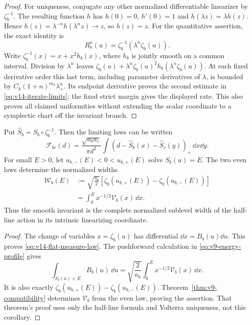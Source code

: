 \begin{proof}
For uniqueness, conjugate any other normalized differentiable
linearizer by $\zeta_b^{-1}$. The resulting function $h$ has
$h(0)=0$, $h'(0)=1$ and $h(\lambda z)=\lambda h(z)$. Hence
$h(z)=\lambda^{-n}h(\lambda^nz)\to z$, so $h(z)=z$.
For the quantitative assertion, the exact identity is
\[
 R_b^n(u)=\zeta_b^{-1}(\lambda^n\zeta_b(u)).
\]
Write $\zeta_b^{-1}(x)=x+x^2h_b(x)$, where $h_b$ is jointly
smooth on a common interval. Division by $\lambda^n$ leaves
$\zeta_b(u)+\lambda^n\zeta_b(u)^2h_b(\lambda^n\zeta_b(u))$.
At each fixed derivative order this last term, including parameter
derivatives of $\lambda$, is bounded by
$C_k(1+n)^{m_k}\lambda_+^n$. Its endpoint derivative proves the
second estimate in \eqref{eq:v14-iterate-limits}; the fixed strict
margin gives the displayed rate. This also proves all claimed
uniformities without extending the scalar coordinate to a symplectic
chart off the invariant branch.
\end{proof}


\begin{corollary}
\label{cor:v14-width}
Put $\widehat S_b=S_b\circ\zeta_b^{-1}$. Then the limiting laws
can be written
\begin{equation}\label{eq:v14-flat-measure-law}
 \mathcal F_{bc}(d)=\frac{\sqrt{a_ba_c}}{\pi d^2}
       \int(d-\widehat S_b(x)-\widehat S_c(y))_+\,\dd x\dd y.
\end{equation}
For small $E>0$, let $u_{b,-}(E)<0<u_{b,+}(E)$ solve $S_b(u)=E$.
The two even laws determine the normalized widths
\begin{equation}\label{eq:v14-width}
 \begin{split}
 \mathcal W_b(E)
   &:=\sqrt{\frac{a_b}{2}}
       [\zeta_b(u_{b,+}(E))-\zeta_b(u_{b,-}(E))]\\
   &=\int_0^E x^{-1/2}\mathcal V_b(x)\,\dd x.
 \end{split}
\end{equation}
Thus the smooth invariant is the complete normalized sublevel width
of the half-line action in its intrinsic linearizing coordinate.
\end{corollary}
\begin{proof}
The change of variables $x=\zeta_b(u)$ has differential
$\dd x=B_b(u)\dd u$. This proves \eqref{eq:v14-flat-measure-law}.
The pushforward calculation in \eqref{eq:v9-energy-profile} gives
\[
 \int_{S_b(u)<E}B_b(u)\,\dd u
       =\sqrt{\frac2{a_b}}\int_0^E x^{-1/2}\mathcal V_b(x)\,\dd x.
\]
It is also exactly
$\zeta_b(u_{b,+}(E))-\zeta_b(u_{b,-}(E))$.
Theorem~\ref{thm:v9-compatibility} determines $\mathcal V_b$ from
the even law, proving the assertion. That theorem's proof uses only
the half-line formula and Volterra uniqueness, not this corollary.
\end{proof}

